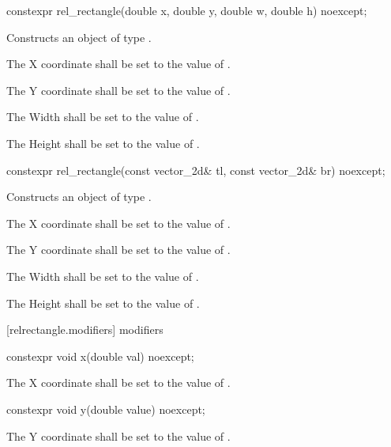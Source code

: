 \begin{itemdecl}
constexpr rel_rectangle(double x, double y, double w, double h) noexcept;
\end{itemdecl}
\begin{itemdescr}
\pnum
\effects
Constructs an object of type .

\pnum
The X coordinate shall be set to the value of .

\pnum
The Y coordinate shall be set to the value of .

\pnum
The Width shall be set to the value of .

\pnum
The Height shall be set to the value of .
\end{itemdescr}

\begin{itemdecl}
constexpr rel_rectangle(const vector_2d& tl, const vector_2d& br) noexcept;
\end{itemdecl}
\begin{itemdescr}
\pnum
\effects
Constructs an object of type .

\pnum
The X coordinate shall be set to the value of .

\pnum
The Y coordinate shall be set to the value of .

\pnum
The Width shall be set to the value of .

\pnum
The Height shall be set to the value of .
\end{itemdescr}

 [relrectangle.modifiers]{ modifiers}

\begin{itemdecl}
constexpr void x(double val) noexcept;
\end{itemdecl}

\begin{itemdescr}
\pnum
\effects
The X coordinate shall be set to the value of .
\end{itemdescr}

\begin{itemdecl}
constexpr void y(double value) noexcept;
\end{itemdecl}
\begin{itemdescr}
\pnum
\effects
The Y coordinate shall be set to the value of .
\end{itemdescr}


